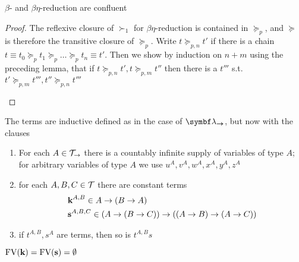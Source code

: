 \documentclass[11pt]{article}
\begin{document}
\begin{theorem}[]
\(\beta\)- and \(\beta \eta\)-reduction are confluent
\end{theorem}
\begin{proof}
The reflexive closure of \(\succ_1\) for \(\beta \eta\)-reduction is contained in
\(\succeq_p\), and \(\succeq\) is therefore the transitive closure of
\(\succeq_p\). Write \(t\succeq_{p,n}t'\) if there is a chain
\(t\equiv t_0\succeq_p t_1\succeq_p\dots\succeq_pt_n\equiv t'\). Then we show
by induction on \(n+m\) using the preceding lemma, that if
\(t\succeq_{p,n}t',t\succeq_{p,m}t''\) then there is a \(t'''\) s.t.
\(t'\succeq_{p,m}t''',t''\succeq_{p,n}t'''\) 
\begin{center}
\end{center}
\end{proof}

\begin{definition}
The terms are inductive defined as in the case of \(\blambda_{\bto}\), but now with
the clauses
\begin{enumerate}
\item For each \(A\in\mathcal{T}_\to\) there is a countably infinite supply of variables
of type \(A\); for arbitrary variables of type \(A\) we use
\(u^A,v^A,w^A,x^A,y^A,z^A\)
\item for each \(A,B,C\in\mathcal{T}\) there are constant terms
\begin{align*}
&\operatorname{\textbf{k}}^{A,B}\in A\to(B\to A)\\
&\operatorname{\textbf{s}}^{A,B,C}\in (A\to(B\to C))\to((A\to B)\to(A\to C))
\end{align*}
\item if \(t^{A,B},s^A\) are terms, then so is \(t^{A,B}s\)
\end{enumerate}


\(\text{FV}(\operatorname{\textbf{k}})=\text{FV}(\operatorname{\textbf{s}})=\emptyset\)
\end{definition}
\end{document}
